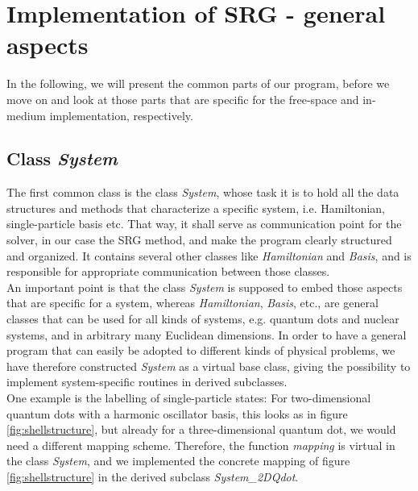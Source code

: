 \section{Implementation of SRG - general aspects}
In the following, we will present the common parts of our program, before we move on and look at those parts that are specific for the free-space and in-medium implementation, respectively.
\subsection{Class \textit{System}}
The first common class is the class \textit{System}, whose task it is to hold all the data structures and methods that characterize a specific system, i.e. Hamiltonian, single-particle basis etc. That way, it shall serve as communication point for the solver, in our case the SRG method, and make the program clearly structured and organized. It contains several other classes like \textit{Hamiltonian} and \textit{Basis}, and is responsible for appropriate communication between those classes. \\
An important point is that the class \textit{System} is supposed to embed those aspects that are specific for a system, whereas \textit{Hamiltonian}, \textit{Basis}, etc., are general classes that can be used for all kinds of systems, e.g. quantum dots and nuclear systems, and in arbitrary many Euclidean dimensions. In order to have a general program that can easily be adopted to different kinds of physical problems, we have therefore constructed \textit{System} as a virtual base class, giving the possibility to implement system-specific routines in derived subclasses. \\
One example is the labelling of single-particle states: For two-dimensional quantum dots with a harmonic oscillator basis, this looks as in figure \ref{fig:shellstructure}, but already for a three-dimensional quantum dot, we would need a different mapping scheme. Therefore, the function \textit{mapping} is virtual in the class \textit{System}, and we implemented the concrete mapping of figure \ref{fig:shellstructure} in the derived subclass  \textit{System\_2DQdot}.

